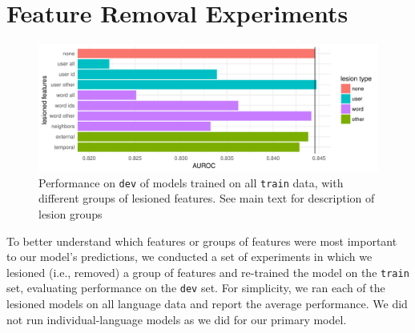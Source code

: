 \documentclass[11pt,a4paper]{article}
\begin{document}
\section{Feature Removal Experiments}

\begin{figure}[htp]
\includegraphics[width=\textwidth]{lesions.pdf}
\caption{Performance on {\tt dev} of models trained on all {\tt train} data,
  with different groups of lesioned features. See main text for description of
  lesion groups}
\label{fig:lesions}
\end{figure}


To better understand which features or groups of features were most important to
our model's predictions, we conducted a set of experiments in which we lesioned
(i.e., removed) a group of features and re-trained the model on the {\tt train}
set, evaluating performance on the {\tt dev} set. For simplicity, we ran each of the
lesioned models on all language data and report the average
performance. We did not run individual-language models as we did for our primary model.
\end{document}
